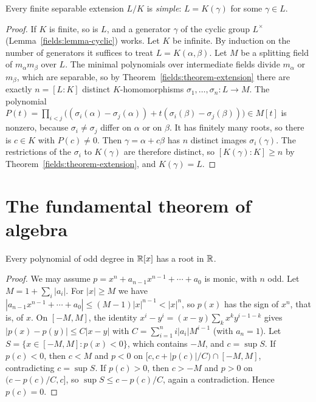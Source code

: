 \begin{theorem}\label{fields:theorem-primitive-element}
Every finite separable extension $L/K$ is \emph{simple}: $L = K(\gamma)$ for some $\gamma \in L$.
\end{theorem}

\begin{proof}
If $K$ is finite, so is $L$, and a generator $\gamma$ of the cyclic group $L^\times$
(Lemma~\ref{fields:lemma-cyclic}) works. Let $K$ be infinite. By induction on the number of
generators it suffices to treat $L = K(\alpha, \beta)$. Let $M$ be a splitting field of
$m_\alpha m_\beta$ over $L$. The minimal polynomials over intermediate fields divide $m_\alpha$ or
$m_\beta$, which are separable, so by Theorem~\ref{fields:theorem-extension} there are exactly
$n = [L : K]$ distinct $K$-homomorphisms $\sigma_1, \ldots, \sigma_n \colon L \to M$. The polynomial
$P(t) = \prod_{i < j}\bigl((\sigma_i(\alpha) - \sigma_j(\alpha)) + t(\sigma_i(\beta) - \sigma_j(\beta))\bigr) \in M[t]$ is
nonzero, because $\sigma_i \neq \sigma_j$ differ on $\alpha$ or on $\beta$. It has finitely many roots, so
there is $c \in K$ with $P(c) \neq 0$. Then $\gamma = \alpha + c\beta$ has $n$ distinct images
$\sigma_i(\gamma)$. The restrictions of the $\sigma_i$ to $K(\gamma)$ are therefore distinct, so
$[K(\gamma) : K] \geq n$ by Theorem~\ref{fields:theorem-extension}, and $K(\gamma) = L$.
\end{proof}

\section{The fundamental theorem of algebra}\label{fields:section-fta}

\begin{lemma}\label{fields:lemma-odd-degree}
Every polynomial of odd degree in $\mathbb{R}[x]$ has a root in $\mathbb{R}$.
\end{lemma}

\begin{proof}
We may assume $p = x^n + a_{n-1}x^{n-1} + \cdots + a_0$ is monic, with $n$ odd. Let
$M = 1 + \sum_i |a_i|$. For $|x| \geq M$ we have
$|a_{n-1}x^{n-1} + \cdots + a_0| \leq (M - 1)|x|^{n-1} < |x|^n$, so $p(x)$ has the sign of $x^n$, that is,
of $x$. On $[-M, M]$, the identity $x^i - y^i = (x - y)\sum_{k} x^k y^{i-1-k}$ gives
$|p(x) - p(y)| \leq C|x - y|$ with $C = \sum_{i=1}^n i|a_i| M^{i-1}$ (with $a_n = 1$). Let
$S = \{x \in [-M, M] : p(x) < 0\}$, which contains $-M$, and $c = \sup S$. If $p(c) < 0$, then
$c < M$ and $p < 0$ on $[c, c + |p(c)|/C) \cap [-M, M]$, contradicting $c = \sup S$. If $p(c) > 0$, then
$c > -M$ and $p > 0$ on $(c - p(c)/C, c]$, so $\sup S \leq c - p(c)/C$, again a contradiction. Hence
$p(c) = 0$.
\end{proof}

